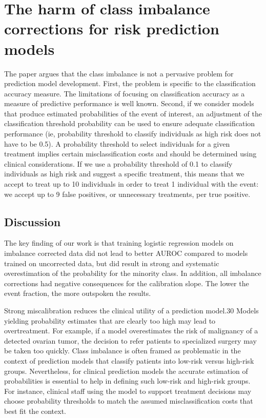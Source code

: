 \section{The harm of class imbalance corrections for risk prediction models}
	The paper argues that the class imbalance is not a pervasive problem for prediction model development. 
	First, the problem is specific to the classification accuracy measure. 
	The limitations of focusing on classification accuracy as a measure of predictive performance is well known. 
	Second, if we consider models that produce estimated probabilities of the event of interest, 
	an adjustment of the classification threshold probability can be used to ensure adequate classification performance 
	(ie, probability threshold to classify individuals as high risk does not have to be 0.5). 
	A probability threshold to select individuals for a given treatment implies certain misclassification costs and should be determined using clinical considerations. 
	If we use a probability threshold of 0.1 to classify individuals as high risk and suggest a specific treatment, 
	this means that we accept to treat up to 10 individuals in order to treat 1 individual with the event: 
	we accept up to 9 false positives, or unnecessary treatments, per true positive.
	
\subsection{Discussion}
	The key finding of our work is that training logistic regression models on imbalance corrected data did not lead to better AUROC 
	compared to models trained on uncorrected data, but did result in strong and systematic overestimation of the probability for the minority class. 
	In addition, all imbalance corrections had negative consequences for the calibration slope. 
	The lower the event fraction, the more outspoken the results.
	
	Strong miscalibration reduces the clinical utility of a prediction model.30 Models yielding probability estimates that are clearly too high may lead to overtreatment. 
	For example, if a model overestimates the risk of malignancy of a detected ovarian tumor, the decision to refer patients to specialized surgery may be taken too quickly. 
	Class imbalance is often framed as problematic in the context of prediction models that classify patients into low-risk versus high-risk groups. 
	Nevertheless, for clinical prediction models the accurate estimation of probabilities is essential to help in defining such low-risk and high-risk groups. 
	For instance, clinical staff using the model to support treatment decisions may choose probability thresholds
	to match the assumed misclassification costs that best fit the context.